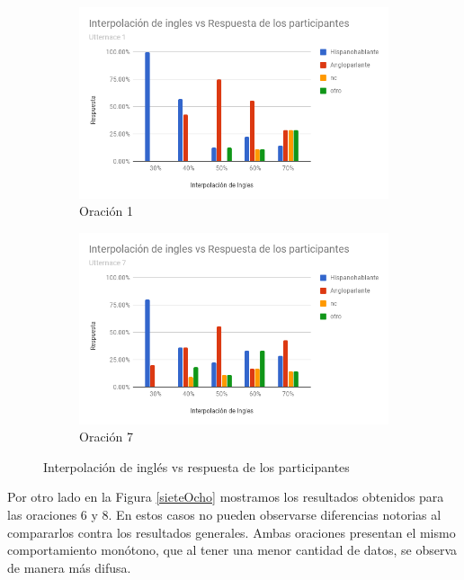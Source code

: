 \begin{figure}
\centering
\begin{subfigure}{.5\textwidth}
  \centering
	\includegraphics[trim={0 0 0 2.5cm},clip,width=1\textwidth]{imagenes/nacionalidades/1.png}
  \caption{Oración 1}
\end{subfigure}%
\begin{subfigure}{.5\textwidth}
  \centering
	\includegraphics[trim={0 0 0 2.5cm},clip,width=1\textwidth]{imagenes/nacionalidades/7.png}
  \caption{Oración 7}
\end{subfigure}
\caption{Interpolación de inglés vs respuesta de los participantes}
\label{unoSeis}
\end{figure}


Por otro lado en la Figura \ref{sieteOcho} mostramos los resultados obtenidos para las oraciones $6$ y $8$. En estos casos no pueden observarse diferencias notorias al compararlos contra los resultados generales. Ambas oraciones presentan el mismo comportamiento monótono, que al tener una menor cantidad de datos, se observa de manera más difusa.


